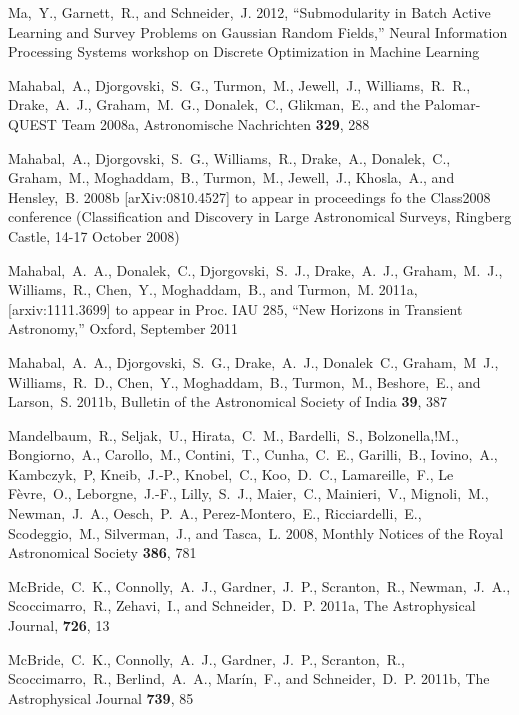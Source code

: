 \documentclass[useAMS,usenatbib,tightenlines,11pt,preprint]{aastex}
\begin{document}
\begin{thebibliography}{99}
Ma,~Y., Garnett,~R., and Schneider,~J. 2012,
``Submodularity in Batch Active Learning and Survey Problems
on Gaussian Random Fields,''
Neural Information Processing Systems 
workshop on Discrete Optimization in Machine Learning

Mahabal,~A., Djorgovski,~S.~G., Turmon,~M., Jewell,~J., Williams,~R.~R.,
Drake,~A.~J., Graham,~M.~G., Donalek,~C., Glikman,~E., and the Palomar-QUEST Team
2008a, Astronomische Nachrichten {\bf 329}, 288

Mahabal,~A., Djorgovski,~S.~G., Williams,~R., Drake,~A., Donalek,~C.,
Graham,~M., Moghaddam,~B., Turmon,~M., Jewell,~J., Khosla,~A., and
Hensley,~B. 2008b [arXiv:0810.4527] to appear in proceedings fo the Class2008
conference (Classification and Discovery in Large Astronomical Surveys, Ringberg
Castle, 14-17 October 2008)

Mahabal,~A.~A., Donalek,~C., Djorgovski,~S.~J., Drake,~A.~J.,
Graham,~M.~J., Williams,~R., Chen,~Y., Moghaddam,~B., and Turmon,~M.
2011a, [arxiv:1111.3699] to appear in Proc. IAU 285, ``New Horizons in Transient
Astronomy,'' Oxford, September 2011

Mahabal,~A.~A., Djorgovski,~S.~G., Drake,~A.~J., Donalek~C., Graham,~M~J.,
Williams,~R.~D., Chen,~Y., Moghaddam,~B., Turmon,~M., Beshore,~E., and Larson,~S.
2011b, Bulletin of the Astronomical Society of India {\bf 39}, 387

Mandelbaum,~R., Seljak,~U., Hirata,~C.~M., Bardelli,~S., Bolzonella,!M.,
Bongiorno,~A., Carollo,~M., Contini,~T., Cunha,~C.~E., Garilli,~B.,
Iovino,~A., Kambczyk,~P, Kneib,~J.-P., Knobel,~C., Koo,~D.~C., Lamareille,~F.,
Le F\`evre,~O., Leborgne,~J.-F., Lilly,~S.~J., Maier,~C., Mainieri,~V.,
Mignoli,~M., Newman,~J.~A., Oesch,~P.~A., Perez-Montero,~E., Ricciardelli,~E.,
Scodeggio,~M., Silverman,~J., and Tasca,~L. 2008, Monthly Notices of the Royal
Astronomical Society {\bf 386}, 781

McBride,~C.~K., Connolly,~A.~J., Gardner,~J.~P., Scranton,~R., Newman,~J.~A.,
Scoccimarro,~R., Zehavi,~I., and Schneider,~D.~P. 2011a, The Astrophysical
Journal, {\bf 726}, 13

McBride,~C.~K., Connolly,~A.~J., Gardner,~J.~P., Scranton,~R., Scoccimarro,~R.,
Berlind,~A.~A., Mar\'in,~F., and Schneider,~D.~P. 2011b, The Astrophysical
Journal {\bf 739}, 85


\end{thebibliography}
\end{document}

